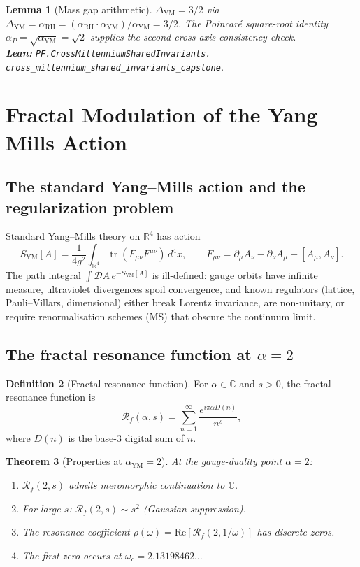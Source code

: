 \documentclass[11pt,a4paper]{article}
\theoremstyle{plain}
\newtheorem{theorem}{Theorem}[section]
\newtheorem{lemma}[theorem]{Lemma}
\theoremstyle{definition}
\newtheorem{definition}[theorem]{Definition}
\DeclareMathOperator{\Tr}{tr}
\newcommand{\R}{\mathbb{R}}
\newcommand{\C}{\mathbb{C}}
\newcommand{\Real}{\mathrm{Re}}
\newcommand{\Rf}{\mathcal{R}_f}
\newcommand{\aYM}{\alpha_{\mathrm{YM}}}
\newcommand{\aRH}{\alpha_{\mathrm{RH}}}
\newcommand{\aP}{\alpha_{P}}
\begin{document}
\begin{lemma}[Mass gap arithmetic]
\label{lem:massgap-arith}
$\Delta_{\mathrm{YM}} = 3/2$ via
$\Delta_{\mathrm{YM}} = \aRH = (\aRH \cdot \aYM)/\aYM = 3/2$. The
Poincar\'e square-root identity $\aP = \sqrt{\aYM} = \sqrt{2}$
supplies the second cross-axis consistency check.\\
\textbf{Lean:}
\texttt{PF.CrossMillenniumSharedInvariants.\\
cross\_millennium\_shared\_invariants\_capstone}.
\end{lemma}

\section{Fractal Modulation of the Yang--Mills Action}
\label{sec:fractal-action}

\subsection{The standard Yang--Mills action and the regularization problem}

Standard Yang--Mills theory on $\R^{4}$ has action
\[
S_{\mathrm{YM}}[A] = \frac{1}{4g^{2}} \int_{\R^{4}}
\Tr(F_{\mu\nu}F^{\mu\nu})\, d^{4}x,
\qquad F_{\mu\nu} = \partial_{\mu}A_{\nu} - \partial_{\nu}A_{\mu} +
[A_{\mu}, A_{\nu}].
\]
The path integral $\int \mathcal{D}A\, e^{-S_{\mathrm{YM}}[A]}$ is
ill-defined: gauge orbits have infinite measure, ultraviolet
divergences spoil convergence, and known regulators (lattice,
Pauli--Villars, dimensional) either break Lorentz invariance, are
non-unitary, or require renormalisation schemes (MS) that obscure
the continuum limit.

\subsection{The fractal resonance function at $\alpha = 2$}

\begin{definition}[Fractal resonance function]
\label{def:Rf}
For $\alpha \in \C$ and $s > 0$, the fractal resonance function is
\[
\Rf(\alpha, s) = \sum_{n=1}^{\infty}
\frac{e^{i\pi\alpha D(n)}}{n^{s}},
\]
where $D(n)$ is the base-$3$ digital sum of $n$.
\end{definition}

\begin{theorem}[Properties at $\aYM = 2$]
\label{thm:alpha-2-properties}
At the gauge-duality point $\alpha = 2$:
\begin{enumerate}[label=(\roman*),leftmargin=*]
\item $\Rf(2, s)$ admits meromorphic continuation to $\C$.
\item For large $s$: $\Rf(2, s) \sim s^{2}$ (Gaussian suppression).
\item The resonance coefficient
$\rho(\omega) = \Real[\Rf(2, 1/\omega)]$ has discrete zeros.
\item The first zero occurs at $\omega_{c} = 2.13198462\ldots$
\end{enumerate}
\end{theorem}
\end{document}
